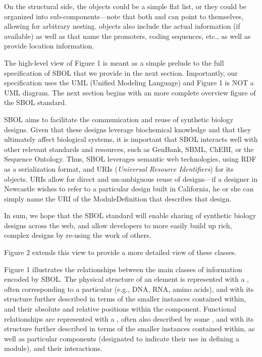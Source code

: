 On the structural side, the  objects could be a simple flat list, or they could be organized into sub-components---note that both  and  can point to themselves, allowing for arbitrary nesting.
 objects also include the actual  information (if available) as well as  that name the promoters, coding sequences, etc., as well as provide location information. 

The high-level view of Figure 1 is meant as a simple prelude to the full specification of SBOL that we provide in the next section. Importantly, our specification uses the UML (Unified Modeling Language) and Figure 1 is NOT a UML diagram. The next section begins with an more complete overview figure of the SBOL standard. 

SBOL aims to facilitate the communication and reuse of synthetic biology designs. Given that these designs leverage biochemical knowledge and that they ultimately affect biological systems, it is important that SBOL interacts well with other relevant standards and resources, such as GenBank, SBML, ChEBI, or the Sequence Ontology. Thus, SBOL leverages semantic web technologies, using RDF as a serialization format, and URIs (\emph{Universal Resource Identifiers}) for its objects. URIs allow for direct and un-ambiguous reuse of designs---if a designer in Newcastle wishes to refer to a particular design built in California, he or she can simply name the URI of the ModuleDefinition that describes that design. 

In sum, we hope that the SBOL standard will enable sharing of synthetic biology designs across the web, and allow developers to more easily build up rich, complex designs by re-using the work of others. 




Figure 2 extends this view to provide a more detailed view of these classes. 


Figure 1 illustrates the relationships between the main classes of information encoded by SBOL.  
The physical structure of an element is represented with a , often corresponding to a particular  (e.g., DNA, RNA, amino acids), and with its structure further described in terms of the smaller  instances contained within, and their absolute and relative positions within the component.
Functional relationships are represented with a , often also described by some , and with its structure further described in terms of the smaller  instances contained within, as well as particular components (designated  to indicate their use in defining a module), and their interactions.



